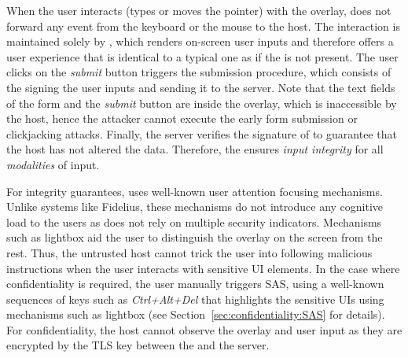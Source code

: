 When the user interacts (types or moves the pointer) with the overlay, \device does not forward any event from the keyboard or the mouse to the host. The interaction is maintained solely by \device, which renders on-screen user inputs and therefore offers a user experience that is identical to a typical one as if the \device is not present. The user clicks on the \emph{submit} button triggers the submission procedure, which consists of the \device signing the user inputs and sending it to the server. Note that the text fields of the form and the \emph{submit} button are inside the overlay, which is inaccessible by the host, hence the attacker cannot execute the early form submission or clickjacking attacks. Finally, the server verifies the signature of \device to guarantee that the host has not altered the data. Therefore, the \device ensures \emph{input integrity} for all \emph{modalities} of input.

For integrity guarantees, \name uses well-known user attention focusing mechanisms. Unlike systems like Fidelius, these mechanisms do not introduce any cognitive load to the users as \name does not rely on multiple security indicators. Mechanisms such as lightbox aid the user to distinguish the \device overlay on the screen from the rest. Thus, the untrusted host cannot trick the user into following malicious instructions when the user interacts with sensitive UI elements. In the case where confidentiality is required, the user manually triggers SAS, using a well-known sequences of keys such as \emph{Ctrl+Alt+Del} that highlights the sensitive UIs using mechanisms such as lightbox (see Section~\ref{sec:confidentiality:SAS} for details). For confidentiality, the host cannot observe the overlay and user input as they are encrypted by the TLS key between the \device and the server.


